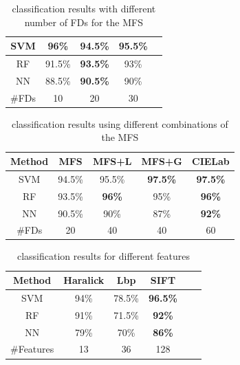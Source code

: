 \documentclass[a4paper,10pt]{article}
\begin{document}
\begin{table}[h]
\begin{center}
\caption{classification results with different number of FDs for the MFS}
\vspace{2mm}
\label{tab:number}       %
\begin{tabular}{|c|c|c|c|c|}
\hline
SVM & \textbf{96\%} & 94.5\% & 95.5\% \\
\hline
RF  & 91.5\% & \textbf{93.5\%} & 93\% \\
\hline
NN & 88.5\% & \textbf{90.5\%} & 90\% \\
\hline
\hline
\#FDs & 10  & 20 & 30 \\
\hline
\end{tabular}
\end{center}
\end{table}


\begin{table}[h]
\begin{center}
\caption{classification results using different combinations of the MFS}
\vspace{2mm}
\label{tab:mfs}       %
\begin{tabular}{|c|c|c|c|c|}
\hline
Method & MFS & MFS+L & MFS+G & CIELab  \\
\hline
\hline
SVM & 94.5\% & 95.5\% & \textbf{97.5\%} & \textbf{97.5\%} \\
\hline
RF  & 93.5\% & \textbf{96\%} & 95\% & \textbf{96\%} \\
\hline
NN & 90.5\% & 90\% & 87\% & \textbf{92\%} \\
\hline
\hline
\#FDs & 20 & 40 & 40 & 60 \\
\hline
\end{tabular}
\end{center}
\end{table}


\begin{table}[h]
\begin{center}
\caption{classification results for different features}
\vspace{2mm}
\label{tab:other}       %
\begin{tabular}{|c|c|c|c|c|c|}
\hline
Method & Haralick & Lbp & SIFT\\ %
\hline
\hline
SVM & 94\% & 78.5\% & \textbf{96.5\%} \\ %
\hline
RF  & 91\% & 71.5\% & \textbf{92\%} \\ %
\hline
NN & 79\% & 70\% & \textbf{86\%} \\ %
\hline
\hline
\#Features & 13 & 36 & 128 \\
\hline
\end{tabular}
\end{center}
\end{table}
\end{document}

